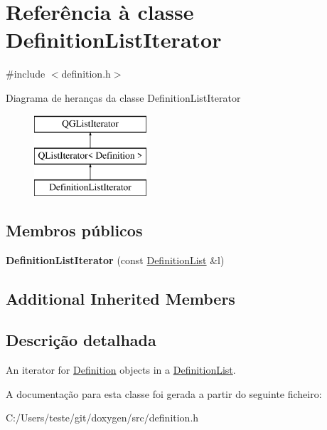 \hypertarget{class_definition_list_iterator}{\section{Referência à classe Definition\-List\-Iterator}
\label{class_definition_list_iterator}
}


{\ttfamily \#include $<$definition.\-h$>$}

Diagrama de heranças da classe Definition\-List\-Iterator\begin{figure}[H]
\begin{center}
\leavevmode
\includegraphics[height=3.000000cm]{class_definition_list_iterator}
\end{center}
\end{figure}
\subsection*{Membros públicos}
\begin{DoxyCompactItemize}
\item 
\hypertarget{class_definition_list_iterator_aa8fe3cf2ebdcd24b3b002a6579249c66}{{\bfseries Definition\-List\-Iterator} (const \hyperlink{class_definition_list}{Definition\-List} \&l)}\label{class_definition_list_iterator_aa8fe3cf2ebdcd24b3b002a6579249c66}

\end{DoxyCompactItemize}
\subsection*{Additional Inherited Members}


\subsection{Descrição detalhada}
An iterator for \hyperlink{class_definition}{Definition} objects in a \hyperlink{class_definition_list}{Definition\-List}. 

A documentação para esta classe foi gerada a partir do seguinte ficheiro\-:\begin{DoxyCompactItemize}
\item 
C\-:/\-Users/teste/git/doxygen/src/definition.\-h\end{DoxyCompactItemize}
